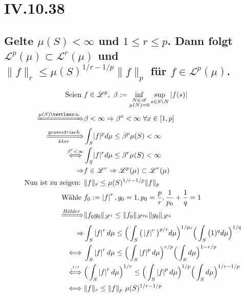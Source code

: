 \documentclass[12pt,a4paper]{article}
\begin{document}
\pagestyle{fancy}
\fancyhf{}
\rfoot{\thepage}

\section*{IV.10.38}
\subsection*{Gelte $\mu(S) < \infty$ und $1\leq r \leq p$. Dann folgt $\mathscr{L}^p(\mu) \subset \mathscr{L}^r(\mu)$ und $\lVert f \rVert_r \leq \mu(S)^{1/r - 1/p}\lVert f \rVert_p$ für $f \in \mathscr{L}^p(\mu)$. }
\begin{align*}
	\text{Seien } &f \in \mathscr{L}^p , \ \beta := \inf_{\substack{N \in \mathscr{A} \\ \mu(N)=0}} \sup_{s \in S\setminus N}|f(s)|\\
	\xRightarrow{\mu(S)\textless \infty} & \beta < \infty \Rightarrow \beta^x < \infty \ \forall x \in [1,p]\\
	\xRightarrow[klar]{geometrisch} &\int_S \lvert f \rvert^p d\mu \leq \beta^p \mu(S) < \infty\\
	\overset{\beta^r < \infty}{\iff} &\int_S \lvert f \rvert^r d\mu\leq \beta^r \mu(S) < \infty\\
	\Rightarrow & f \in \mathscr{L}^r \Rightarrow \mathscr{L}^p(\mu) \subset \mathscr{L}^r(\mu)\\
	\text{Nun ist zu zeigen: } &\lVert f \rVert_r \leq \mu(S)^{1/r - 1/p}\lVert f \rVert_p\\
	\text{Wähle } &f_0 := \left\lvert f\right\lvert^r, g_0 = 1, p_0 = \frac{p}{r},\frac{1}{p_0}+\frac{1}{q} = 1 \\
	\xRightarrow{\emph{Hölder}} &\lVert f_0g_0 \rVert_{\mathscr{L}^1} \leq \lVert f_0 \rVert_{\mathscr{L}^{p_0}} \lVert g_0 \rVert_{\mathscr{L}^q}\\
	\Rightarrow &\int_S\left\lvert f \right\lvert^rd\mu \leq \Big(\int_S\big(\left\lvert f\right\lvert^r\big)^{p/r}d\mu\Big)^{1/p_0}\Big(\int_S\big(1)^{q}d\mu\Big)^{1/q}\\
	\iff &\int_S\left\lvert f \right\lvert^rd\mu \leq \Big(\int_S\left\lvert f\right\lvert^pd\mu\Big)^{r/p}\Big(\int_S  d\mu\Big)^{1-r/p}\\
	\overset{\cdot ^{1/r}}{\iff}&\Big(\int_S\left\lvert f \right\lvert^rd\mu\Big)^{1/r} \leq \Big(\int_S\left\lvert f\right\lvert^pd\mu\Big)^{1/p}\Big(\int_S  d\mu\Big)^{1/r-1/p}\\
	\iff &\lVert f \rVert_r \leq \lVert f\rVert_p \ \mu(S)^{1/r-1/p}
\end{align*}
\end{document}
